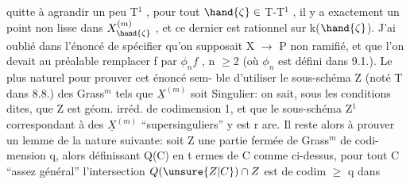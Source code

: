 quitte à agrandir un peu T$^{1}$ , pour tout $\hand{\zeta}\in$ T-T$^{1}$ , il y a exactement un
point non lisse dans $X^{(m)}_{\hand{\zeta}}$ , et ce dernier est rationnel sur k($\hand{\zeta}$). J'ai
oublié dans l'énoncé de spécifier qu'on supposait X  $\longrightarrow$ P non ramifié,
et que l'on devait au préalable remplacer f par $\phi_{n}f$ , n $\geq$2 (où $\phi_{n}$ est
défini dans 9.1.). Le plus naturel  pour prouver cet énoncé sem-%
ble d'utiliser le sous-schéma Z (noté T dans 8.8.) des Grass$^{m}$ tels
que $\underline{X}^{(m)}$ soit Singulier: on sait, sous les conditions dites, que Z
est géom. irréd. de codimension 1, et que le sous-schéma Z$^{1}$ correspondant
à des $\underline{X}^{(m)}$ ``supersinguliers'' y est r are. Il reste alors à prouver un
lemme de la nature suivante: soit Z une partie fermée de Grass$^{m}$ de codi-%
mension q, alors définissant Q(C) en t ermes de C comme ci-dessus, pour
tout C ``assez général'' l'intersection $Q(\unsure{Z|C})\cap Z$ est de codim $\geq$ q dans

